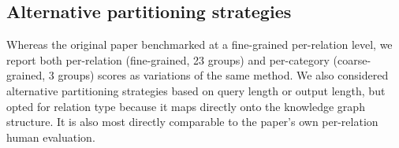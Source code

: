 
\subsection{Alternative partitioning strategies}

Whereas the original paper benchmarked at a fine-grained per-relation level, we report both per-relation (fine-grained, 23 groups) and per-category (coarse-grained, 3 groups) scores as variations of the same method.  We also considered alternative partitioning strategies based on query length or output length, but opted for relation type because it maps directly onto the knowledge graph structure. It is also most directly comparable to the paper's own per-relation human evaluation.
